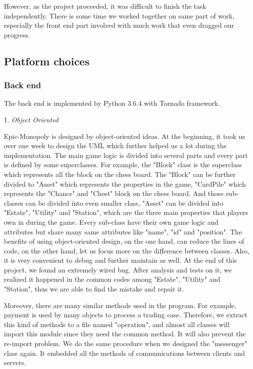 \documentclass[a4paper,11pt]{article}
\begin{document}
However, as the project proceeded, it was difficult to finish the task independently. There is some time we worked together on same part of work, especially the front end part involved with much work that even dragged our progress. 

\subsection{Platform choices}
\subsubsection{Back end}
 The back end is implemented by Python $3.6.4$ with Tornado framework.
 
1.	\emph{Object Oriented}
 
Epic-Monopoly is designed by object-oriented ideas. At the beginning, it took us over one week to design the UML which further helped us a lot during the implementation. The main game logic is divided into several parts and every part is defined by some superclasses. For example, the "Block" class is the superclass which represents all the block on the chess board. The "Block" can be further divided to "Asset" which represents the properties in the game, "CardPile" which represents the "Chance" and "Chest" block on the chess board. And those sub-classes can be divided into even smaller class, "Asset" can be divided into "Estate", "Utility" and "Station", which are the three main properties that players own in during the game. Every sub-class have their own game logic and attributes but share many same attributes like "name", "id" and "position". The benefits of using object-oriented design, on the one hand, can reduce the lines of code, on the other hand, let us focus more on the difference between classes. Also, it is very convenient to debug and further maintain as well. At the end of this project, we found an extremely wired bug. After analysis and tests on it, we realized it happened in the common codes among "Estate", "Utility" and "Station", thus we are able to find the mistake and repair it.

Moreover, there are many similar methods used in the program. For example, payment is used by many objects to process a trading case. Therefore, we extract this kind of methods to a file named "operation", and almost all classes will import this module since they need the common method. It will also prevent the re-import problem. We do the same procedure when we designed the "messenger" class again. It embedded all the methods of communications between clients and servers.
\end{document}
